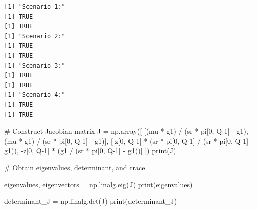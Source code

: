 \documentclass[
  letterpaper,
  DIV=11,
  numbers=noendperiod]{scrreprt}
\newenvironment{Shaded}{\begin{snugshade}}{\end{snugshade}}
\newcommand{\BuiltInTok}[1]{\textcolor[rgb]{0.00,0.23,0.31}{#1}}
\newcommand{\CommentTok}[1]{\textcolor[rgb]{0.37,0.37,0.37}{#1}}
\newcommand{\DecValTok}[1]{\textcolor[rgb]{0.68,0.00,0.00}{#1}}
\newcommand{\NormalTok}[1]{\textcolor[rgb]{0.00,0.23,0.31}{#1}}
\newcommand{\OperatorTok}[1]{\textcolor[rgb]{0.37,0.37,0.37}{#1}}
\begin{document}
\begin{verbatim}
[1] "Scenario 1:"
[1] TRUE
[1] TRUE
[1] "Scenario 2:"
[1] TRUE
[1] TRUE
[1] "Scenario 3:"
[1] TRUE
[1] TRUE
[1] "Scenario 4:"
[1] TRUE
[1] TRUE
\end{verbatim}

\begin{tcolorbox}[enhanced jigsaw, titlerule=0mm, breakable, bottomrule=.15mm, toprule=.15mm, colbacktitle=quarto-callout-note-color!10!white, rightrule=.15mm, toptitle=1mm, opacityback=0, left=2mm, coltitle=black, title=\textcolor{quarto-callout-note-color}{\faInfo}\hspace{0.5em}{Python code}, colframe=quarto-callout-note-color-frame, opacitybacktitle=0.6, leftrule=.75mm, bottomtitle=1mm, arc=.35mm, colback=white]

\begin{Shaded}
\begin{Highlighting}[]
\CommentTok{\# Construct Jacobian matrix}
\NormalTok{J }\OperatorTok{=}\NormalTok{ np.array([}
\NormalTok{    [(mu }\OperatorTok{*}\NormalTok{ g1) }\OperatorTok{/}\NormalTok{ (sr }\OperatorTok{*}\NormalTok{ pi[}\DecValTok{0}\NormalTok{, Q}\OperatorTok{{-}}\DecValTok{1}\NormalTok{] }\OperatorTok{{-}}\NormalTok{ g1), (mu }\OperatorTok{*}\NormalTok{ g1) }\OperatorTok{/}\NormalTok{ (sr }\OperatorTok{*}\NormalTok{ pi[}\DecValTok{0}\NormalTok{, Q}\OperatorTok{{-}}\DecValTok{1}\NormalTok{] }\OperatorTok{{-}}\NormalTok{ g1)],}
\NormalTok{    [}\OperatorTok{{-}}\NormalTok{z[}\DecValTok{0}\NormalTok{, Q}\OperatorTok{{-}}\DecValTok{1}\NormalTok{] }\OperatorTok{*}\NormalTok{ (sr }\OperatorTok{*}\NormalTok{ pi[}\DecValTok{0}\NormalTok{, Q}\OperatorTok{{-}}\DecValTok{1}\NormalTok{] }\OperatorTok{/}\NormalTok{ (sr }\OperatorTok{*}\NormalTok{ pi[}\DecValTok{0}\NormalTok{, Q}\OperatorTok{{-}}\DecValTok{1}\NormalTok{] }\OperatorTok{{-}}\NormalTok{ g1)), }\OperatorTok{{-}}\NormalTok{z[}\DecValTok{0}\NormalTok{, Q}\OperatorTok{{-}}\DecValTok{1}\NormalTok{] }\OperatorTok{*}\NormalTok{ (g1 }\OperatorTok{/}\NormalTok{ (sr }\OperatorTok{*}\NormalTok{ pi[}\DecValTok{0}\NormalTok{, Q}\OperatorTok{{-}}\DecValTok{1}\NormalTok{] }\OperatorTok{{-}}\NormalTok{ g1))]}
\NormalTok{])}
\BuiltInTok{print}\NormalTok{(J)}

\CommentTok{\# Obtain eigenvalues, determinant, and trace}

\NormalTok{eigenvalues, eigenvectors }\OperatorTok{=}\NormalTok{ np.linalg.eig(J)}
\BuiltInTok{print}\NormalTok{(eigenvalues)}

\NormalTok{determinant\_J }\OperatorTok{=}\NormalTok{ np.linalg.det(J)}
\BuiltInTok{print}\NormalTok{(determinant\_J)}


\end{Highlighting}
\end{Shaded}
\end{tcolorbox}
\end{document}
